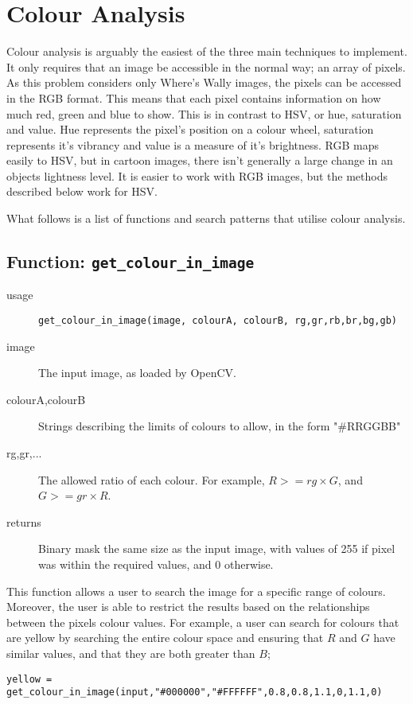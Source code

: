 \documentclass[../main.tex]{subfiles}
\begin{document}
  \section{Colour Analysis}
    Colour analysis is arguably the easiest of the three main techniques to implement.
    It only requires that an image be accessible in the normal way; an array of pixels.
    As this problem considers only Where's Wally images, the pixels can be accessed in the RGB format.
    This means that each pixel contains information on how much red, green and blue to show.
    This is in contrast to HSV, or hue, saturation and value.
    Hue represents the pixel's position on a colour wheel, saturation represents it's vibrancy and value is a measure of it's brightness.
    RGB maps easily to HSV, but in cartoon images, there isn't generally a large change in an objects lightness level.
    It is easier to work with RGB images, but the methods described below work for HSV.

    What follows is a list of functions and search patterns that utilise colour analysis.

  \subsection{Function: \texttt{get\_colour\_in\_image}}
    \begin{description}
      \item[usage] \texttt{get\_colour\_in\_image(image, colourA, colourB, rg,gr,rb,br,bg,gb)}
      \item[image] The input image, as loaded by OpenCV.
      \item[colourA,colourB] Strings describing the limits of colours to allow, in the form "\#RRGGBB"
      \item[rg,gr,...] The allowed ratio of each colour. For example, $R >= rg\times G$, and $G >=gr\times R$.
      \item[returns] Binary mask the same size as the input image, with values of 255 if pixel was within the required values, and 0 otherwise.
    \end{description}

    This function allows a user to search the image for a specific range of colours.
    Moreover, the user is able to restrict the results based on the relationships between the pixels colour values.
    For example, a user can search for colours that are yellow by searching the entire colour space and ensuring that $R$ and $G$ have similar values, and that they are both greater than $B$;
    \begin{center}
      \texttt{yellow = get\_colour\_in\_image(input,"\#000000","\#FFFFFF",0.8,0.8,1.1,0,1.1,0)}
    \end{center}
\end{document}
